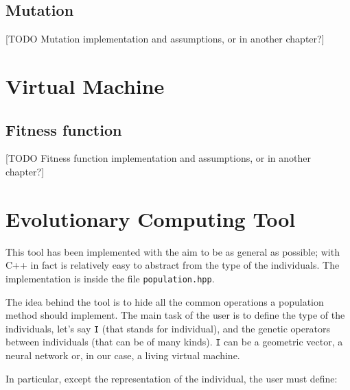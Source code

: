 \documentclass{report}
\begin{document}
\subsection{Mutation}
\label{sec:mutation}
[TODO Mutation implementation and assumptions, or in another chapter?]


\section{Virtual Machine}

\subsection{Fitness function}
\label{sec:fitness}
[TODO Fitness function implementation and assumptions, or in another chapter?]



\section{Evolutionary Computing Tool}
This tool has been implemented with the aim to be as general as possible; with C++ in fact is relatively easy to abstract from the type of the individuals. The implementation is inside the file \texttt{population.hpp}.

The idea behind the tool is to hide all the common operations a population method should implement. The main task of the user is to define the type of the individuals, let's say \texttt{I} (that stands for individual), and the genetic operators between individuals (that can be of many kinds). \texttt{I} can be a geometric vector, a neural network or, in our case, a living virtual machine.

In particular, except the representation of the individual, the user must define:
\end{document}

